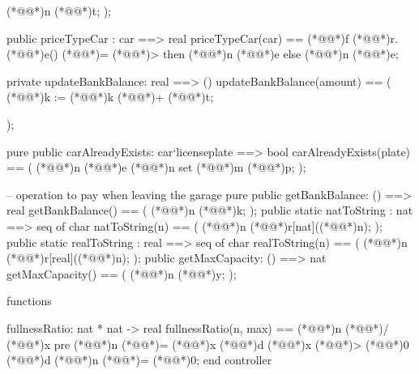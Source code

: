 \documentclass[a4paper]{article}
\begin{document}
\begin{vdm_al}
    (*@@*)n (*@@*)t;
);

public priceTypeCar : car ==> real
priceTypeCar(car) ==
    (*@@*)f (*@@*)r.(*@@*)e() (*@\vdmnotcovered{}@*)= (*@@*)> then
        (*@@*)n (*@@*)e
    else
        (*@@*)n (*@@*)e;

private updateBankBalance: real ==> ()
updateBankBalance(amount) == (
    (*@@*)k := (*@@*)k (*@\vdmnotcovered{}@*)+ (*@@*)t;

);

pure public carAlreadyExists: car`licenseplate ==> bool
carAlreadyExists(plate) == (
    (*@@*)n (*@@*)e (*@@*)n set (*@@*)m (*@@*)p;
);

-- operation to pay when leaving the garage
pure public getBankBalance: () ==> real
getBankBalance() == (
    (*@@*)n (*@@*)k;
);
public static natToString : nat ==> seq of char 
  natToString(n) ==
  (
   (*@@*)n (*@@*)r[nat]((*@\vdmnotcovered{}@*)n);
  );
public static realToString : real ==> seq of char
realToString(n) ==
(
    (*@@*)n (*@@*)r[real]((*@\vdmnotcovered{}@*)n);
);
public getMaxCapacity: () ==> nat
getMaxCapacity() == (
    (*@@*)n (*@@*)y;
);

functions

fullnessRatio: nat * nat -> real
fullnessRatio(n, max) == 
    (*@\vdmnotcovered{}@*)n (*@\vdmnotcovered{}@*)/ (*@@*)x
    pre (*@\vdmnotcovered{}@*)n (*@\vdmnotcovered{<}@*)= (*@@*)x (*@@*)d (*@@*)x (*@\vdmnotcovered{}@*)> (*@\vdmnotcovered{}@*)0 (*@@*)d (*@\vdmnotcovered{}@*)n (*@\vdmnotcovered{>}@*)= (*@\vdmnotcovered{}@*)0;
end controller
\end{vdm_al}
\bigskip
\end{document}
